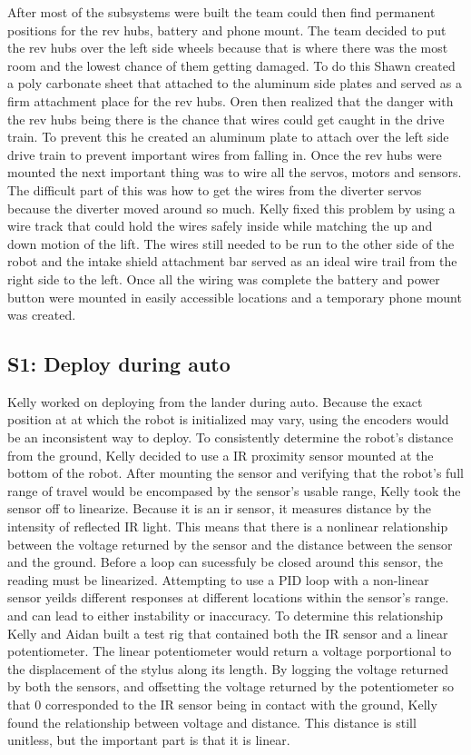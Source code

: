 \documentclass{article}
\begin{document}
After most of the subsystems were built the team could then find permanent positions for the rev hubs, battery and phone mount. The team decided to put the rev hubs over the left side wheels because that is where there was the most room and the lowest chance of them getting damaged. To do this Shawn created a poly carbonate sheet that attached to the aluminum side plates and served as a firm attachment place for the rev hubs. Oren then realized that the danger with the rev hubs being there is the chance that wires could get caught in the drive train. To prevent this he created an aluminum plate to attach over the left side drive train to prevent important wires from falling in. Once the rev hubs were mounted the next important thing was to wire all the servos, motors and sensors. The difficult part of this was how to get the wires from the diverter servos because the diverter moved around so much. Kelly fixed this problem by using a wire track that could hold the wires safely inside while matching the up and down motion of the lift. The wires still needed to be run to the other side of the robot and the intake shield attachment bar served as an ideal wire trail from the right side to the left. Once all the wiring was complete the battery and power button were mounted in easily accessible locations and a temporary phone mount was created.


\subsection{S1: Deploy during auto}

Kelly worked on deploying from the lander during auto. Because the exact position at at which the robot is initialized may vary, using the encoders would be an inconsistent way to deploy. To consistently determine the robot's distance from the ground, Kelly decided to use a IR proximity sensor mounted at the bottom of the robot. After mounting the sensor and verifying that the robot's full range of travel would be encompased by the sensor's usable range, Kelly took the sensor off to linearize. Because it is an ir sensor, it measures distance by the intensity of reflected IR light. This means that there is a nonlinear relationship between the voltage returned by the sensor and the distance between the sensor and the ground. Before a loop can sucessfuly be closed around this sensor, the reading must be linearized. Attempting to use a PID loop with a non-linear sensor yeilds different responses at different locations within the sensor's range. and can lead to either instability or inaccuracy. To determine this relationship Kelly and Aidan built a test rig that contained both the IR sensor and a linear potentiometer. The linear potentiometer would return a voltage porportional to the displacement of the stylus along its length. By logging the voltage returned by both the sensors, and offsetting the voltage returned by the potentiometer so that 0 corresponded to the IR sensor being in contact with the ground, Kelly found the relationship between voltage and distance. This distance is still unitless, but the important part is that it is linear.
\end{document}
